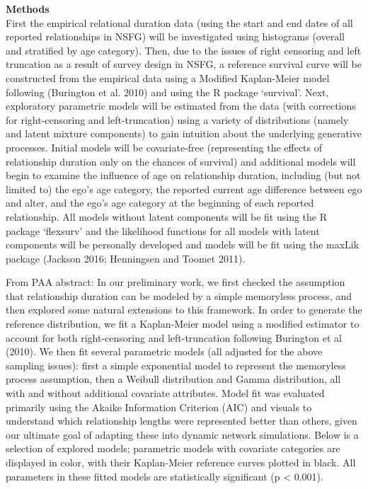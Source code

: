 \documentclass [11pt, proquest] {uwthesis}[2015/03/03]
\begin{document}
\textbf{Methods}\\
First the empirical relational duration data (using the start and end
dates of all reported relationships in NSFG) will be investigated using
histograms (overall and stratified by age category). Then, due to the
issues of right censoring and left truncation as a result of survey
design in NSFG, a reference survival curve will be constructed from the
empirical data using a Modified Kaplan-Meier model following (Burington
et al. 2010) and using the R package `survival'. Next, exploratory
parametric models will be estimated from the data (with corrections for
right-censoring and left-truncation) using a variety of distributions
(namely and latent mixture components) to gain intuition about the
underlying generative processes. Initial models will be covariate-free
(representing the effects of relationship duration only on the chances
of survival) and additional models will begin to examine the influence
of age on relationship duration, including (but not limited to) the
ego's age category, the reported current age difference between ego and
alter, and the ego's age category at the beginning of each reported
relationship. All models without latent components will be fit using the
R package `flexsurv' and the likelihood functions for all models with
latent components will be personally developed and models will be fit
using the maxLik package (Jackson 2016; Henningsen and Toomet 2011).

From PAA abstract: In our preliminary work, we first checked the
assumption that relationship duration can be modeled by a simple
memoryless process, and then explored some natural extensions to this
framework. In order to generate the reference distribution, we fit a
Kaplan-Meier model using a modified estimator to account for both
right-censoring and left-truncation following Burington et al (2010). We
then fit several parametric models (all adjusted for the above sampling
issues): first a simple exponential model to represent the memoryless
process assumption, then a Weibull distribution and Gamma distribution,
all with and without additional covariate attributes. Model fit was
evaluated primarily using the Akaike Information Criterion (AIC) and
visuals to understand which relationship lengths were represented better
than others, given our ultimate goal of adapting these into dynamic
network simulations. Below is a selection of explored models; parametric
models with covariate categories are displayed in color, with their
Kaplan-Meier reference curves plotted in black. All parameters in these
fitted models are statistically significant (p \textless{} 0.001).
\end{document}

